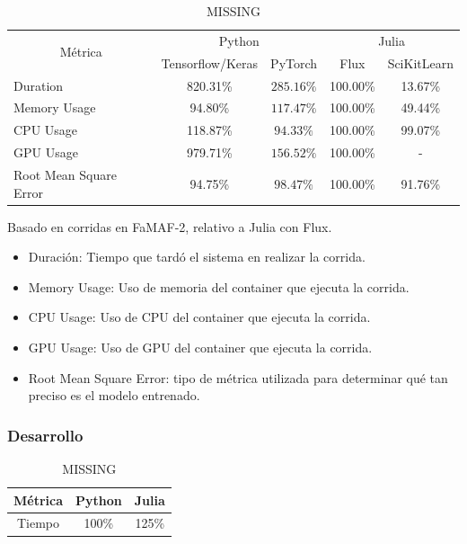 \documentclass[11pt]{article}
\let\Oldsubsubsection\subsubsection
\renewcommand{\subsubsection}{\FloatBarrier\Oldsubsubsection}
\begin{document}
\begin{table}[H]
\centering
\begin{tabular}{|l|cc|cc|}
\hline
\multicolumn{1}{|c|}{\multirow{2}{*}{Métrica}} & \multicolumn{2}{c|}{Python} & \multicolumn{2}{c|}{Julia} \\ \cline{2-5} 
\multicolumn{1}{|c|}{} & \multicolumn{1}{c|}{Tensorflow/Keras} & PyTorch & \multicolumn{1}{c|}{Flux} & SciKitLearn \\ \hline
Duration & \multicolumn{1}{c|}{820.31\%} & $285.16\%$& \multicolumn{1}{c|}{100.00\%} & \multicolumn{1}{c|}{13.67\%} \\ \hline
Memory Usage & \multicolumn{1}{c|}{94.80\%} & $117.47\%$& \multicolumn{1}{c|}{100.00\%} & \multicolumn{1}{c|}{49.44\%} \\ \hline
CPU Usage & \multicolumn{1}{c|}{118.87\%} & $94.33\%$& \multicolumn{1}{c|}{100.00\%} & \multicolumn{1}{c|}{99.07\%} \\ \hline
GPU Usage & \multicolumn{1}{c|}{979.71\%} & $156.52\%$& \multicolumn{1}{c|}{100.00\%} & - \\ \hline
Root Mean Square Error & \multicolumn{1}{c|}{94.75\%} & $98.47\%$& \multicolumn{1}{c|}{100.00\%} & \multicolumn{1}{c|}{91.76\%} \\ \hline
\end{tabular}
\caption{MISSING} %
\end{table}

Basado en corridas en FaMAF-2, relativo a Julia con Flux. %

\begin{itemize}
    \item Duración: Tiempo que tardó el sistema en realizar la corrida.
    \item Memory Usage: Uso de memoria del container que ejecuta la corrida.
    \item CPU Usage: Uso de CPU del container que ejecuta la corrida.
    \item GPU Usage: Uso de GPU del container que ejecuta la corrida.
    \item Root Mean Square Error: tipo de métrica utilizada para determinar qué tan preciso es el modelo entrenado.
\end{itemize}

\subsubsection{Desarrollo}

\begin{table}[H]
\centering
\begin{tabular}{|c|c|c|}
\hline
Métrica & Python & Julia \\ \hline
Tiempo & 100\% & 125\% \\ \hline
\end{tabular}
\caption{MISSING} %
\end{table}
\end{document}
